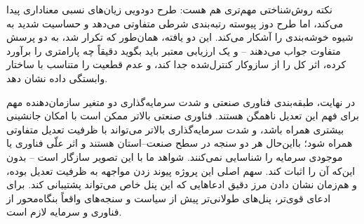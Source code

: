 \documentclass[11pt]{article}
\begin{document}
نکته روش‌شناختی مهم‌تری هم هست: طرح دودویی زیان‌های نسبی معناداری پیدا می‌کند، اما طرح دوز پیوسته رتبه‌بندی شرطی متفاوتی می‌دهد و حساسیت شدید به شیوه خوشه‌بندی را آشکار می‌کند. این دو یافته، همان‌طور که تکرار شد، به دو پرسش متفاوت جواب می‌دهند -- و یک ارزیابی معتبر باید بگوید دقیقاً چه پارامتری را برآورد کرده، اثر کل را از سازوکار کنترل‌شده جدا کند، و عدم قطعیت را متناسب با ساختار وابستگی داده نشان دهد.

در نهایت، طبقه‌بندی فناوری صنعتی و شدت سرمایه‌گذاری دو متغیر سازمان‌دهنده مهم برای فهم این تعدیل ناهمگن هستند. فناوری صنعتی بالاتر ممکن است با امکان جانشینی بیشتری همراه باشد، و شدت سرمایه‌گذاری بالاتر می‌تواند با ظرفیت تعدیل متفاوتی همراه شود؛ بااین‌حال هر دو سنجه در سطح صنعت--استان هستند و اثر علّی فناوری یا موجودی سرمایه را شناسایی نمی‌کنند. شواهد ما با این تصویر سازگار است -- بدون این‌که آن را اثبات کند. سهم اصلی این پروژه پیوند زدن مواجهه به ظرفیت تعدیل بوده، و هم‌زمان نشان دادن مرز دقیق ادعاهایی که این پنل خاص می‌تواند پشتیبانی کند. برای ادعای قوی‌تر، پنل‌های طولانی‌تر پیش از سیاست و سنجه‌های واقعاً بنگاه‌محور از فناوری و سرمایه لازم است.
\end{document}
